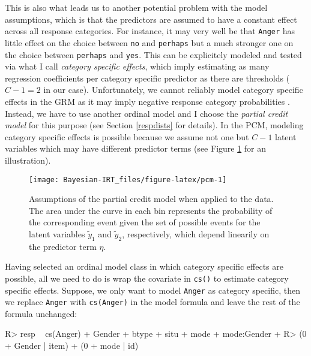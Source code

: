 \documentclass[
]{jss}
\begin{document}
This is also what leads us to another potential problem with the model
assumptions, which is that the predictors are assumed to have a constant
effect across all response categories. For instance, it may very well be
that \texttt{Anger} has little effect on the choice between \texttt{no}
and \texttt{perhaps} but a much stronger one on the choice between
\texttt{perhaps} and \texttt{yes}. This can be explicitely modeled and
tested via what I call \emph{category specific effects}, which imply
estimating as many regression coefficients per category specific
predictor as there are thresholds (\(C - 1 = 2\) in our case).
Unfortunately, we cannot reliably model category specific effects in the
GRM as it may imply negative response category probabilities
\citep{buerkner2019}. Instead, we have to use another ordinal model and
I choose the \emph{partial credit model} \citep[PCM;][]{rasch1961} for
this purpose (see Section \ref{respdists} for details). In the PCM,
modeling category specific effects is possible because we assume not one
but \(C - 1\) latent variables which may have different predictor terms
(see Figure \ref{fig:pcm} for an illustration).

\begin{CodeChunk}
\begin{figure}

{\centering \texttt{[image: Bayesian-IRT\_files/figure-latex/pcm-1]} 

}

\caption{Assumptions of the partial credit model when applied to the  data. The area under the curve in each bin represents the probability of the corresponding event given the set of possible events for the latent variables $\tilde{y}_1$ and $\tilde{y}_2$, respectively, which depend linearily on the predictor term $\eta$.}\label{fig:pcm}
\end{figure}
\end{CodeChunk}

Having selected an ordinal model class in which category specific
effects are possible, all we need to do is wrap the covariate in
\texttt{cs()} to estimate category specific effects. Suppose, we only
want to model \texttt{Anger} as category specific, then we replace
\texttt{Anger} with \texttt{cs(Anger)} in the model formula and leave
the rest of the formula unchanged:

\begin{CodeChunk}

\begin{CodeInput}
R> resp ~ cs(Anger) + Gender + btype + situ + mode + mode:Gender +
R>   (0 + Gender | item) + (0 + mode | id)
\end{CodeInput}
\end{CodeChunk}
\end{document}
